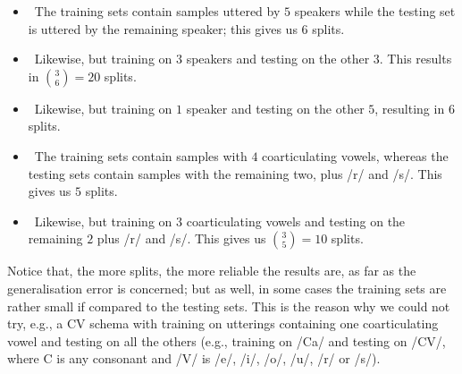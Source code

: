 \begin{itemize}

  \item \spka\ The training sets contain samples
  	uttered by $5$ speakers while the testing set is
  	uttered by the remaining speaker; this gives us $6$ splits.

  \item \spkb\ Likewise, but training on $3$ speakers and testing on the
  	other $3$. This results in $\binom{3}{6} = 20$ splits.

  \item \spkc\ Likewise, but training on $1$ speaker and testing on the
  	other $5$, resulting in $6$ splits.

  \item \coa\ The training sets contain samples
  	with $4$ coarticulating vowels, whereas the testing sets contain samples
  	with the remaining two, plus /r/ and /s/. This gives us $5$ splits.

  \item \cob\ Likewise, but training on $3$ coarticulating vowels and
  	testing on the remaining $2$ plus /r/ and /s/. This gives us
  	$\binom{3}{5} = 10$ splits.

\end{itemize}

Notice that, the more splits, the more reliable the results are, as far as the
generalisation error is concerned; but as well, in some cases the training sets
are rather small if compared to the testing sets. This is the reason why we could
not try, e.g., a CV schema with training on utterings containing
one coarticulating vowel and testing on all the others (e.g., training on
/Ca/ and testing on /CV/, where C is any consonant and /V/ is
/e/, /i/, /o/, /u/, /r/ or /s/).
